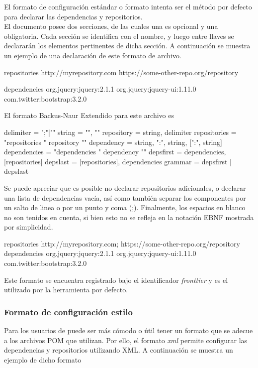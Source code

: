 El formato de configuración estándar o formato \fronttier intenta ser el método
por defecto para declarar las dependencias y repositorios.\\
El documento posee dos secciones, de las cuales una es opcional y una
obligatoria. Cada sección se identifica con el nombre, y luego entre llaves
se declararán los elementos pertinentes de dicha sección. A continuación se muestra
un ejemplo de una declaración de este formato de archivo.
\begin{jscode}
	repositories {
		http://myrepository.com
		https://some-other-repo.org/repository
	}
	
	dependencies {
		org.jquery:jquery:2.1.1
		org.jquery:jquery-ui:1.11.0
		com.twitter:bootstrap:3.2.0
	}
\end{jscode}
El formato Backus-Naur Extendido para este archivo es
\begin{jscode}
	delimiter = ";"|"\n"
	string = "\s", {"\s"}
	repository	= string, delimiter
	repositories = "repositories {" {repository} "}"
	dependency	= string, ":", string, [":", string]
	dependencies = "dependencies {" {dependency} "}"
	depsfirst = dependencies, [repositories]
	depslast = [repositories], dependencies
	grammar = depsfirst | depslast
\end{jscode}
Se puede apreciar que es posible no declarar repositorios adicionales, o declarar una
lista de dependencias vacía, así como también separar los componentes por un salto de
linea o por un punto y coma (;). Finalmente, los espacios en blanco no son tenidos en
cuenta, si bien esto no se refleja en la notación EBNF mostrada por simplicidad.
\begin{jscode}
	repositories {
		http://myrepository.com; https://some-other-repo.org/repository
	}
	dependencies {
		org.jquery:jquery:2.1.1
		org.jquery:jquery-ui:1.11.0
		com.twitter:bootstrap:3.2.0
	}
\end{jscode}
Este formato se encuentra registrado bajo el identificador \emph{fronttier}
y es el utilizado por la herramienta por defecto.

\subsubsection{Formato de configuración estilo \maven}
\label{subsubsec:formats:mvn}

Para los usuarios de \maven puede ser más cómodo o útil tener un formato que se adecue
a los archivos POM que utilizan. Por ello, el formato \emph{xml} permite configurar las
dependencias y repositorios utilizando XML. A continuación se muestra un ejemplo de dicho
formato

